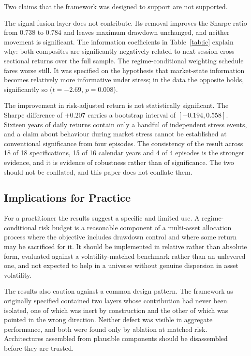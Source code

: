 Two claims that the framework was designed to support are not supported.

The signal fusion layer does not contribute. Its removal improves the Sharpe ratio from
0.738 to 0.784 and leaves maximum drawdown unchanged, and neither movement is
significant. The information coefficients in Table~\ref{tab:ic} explain why: both composites are
significantly negatively related to next-session cross-sectional returns over the full
sample. The regime-conditional weighting schedule fares worse still. It was specified on
the hypothesis that market-state information becomes relatively more informative under
stress; in the data the opposite holds, significantly so ($t = -2.69$, $p = 0.008$).

The improvement in risk-adjusted return is not statistically significant. The Sharpe
difference of $+0.207$ carries a bootstrap interval of $[-0.194, 0.558]$. Sixteen years
of daily returns contain only a handful of independent stress events, and a claim about
behaviour during market stress cannot be established at conventional significance from
four episodes. The consistency of the result across 18 of 18 specifications, 15 of 16
calendar years and 4 of 4 episodes is the stronger evidence, and it is evidence of
robustness rather than of significance. The two should not be conflated, and this paper
does not conflate them.

\subsection{Implications for Practice}

For a practitioner the results suggest a specific and limited use. A regime-conditional
risk budget is a reasonable component of a multi-asset allocation process where the
objective includes drawdown control and where some return may be sacrificed for it. It
should be implemented in relative rather than absolute form, evaluated against a
volatility-matched benchmark rather than an unlevered one, and not expected to help in
a universe without genuine dispersion in asset volatility.

The results also caution against a common design pattern. The framework as originally
specified contained two layers whose contribution had never been isolated, one of which
was inert by construction and the other of which was pointed in the wrong direction.
Neither defect was visible in aggregate performance, and both were found only by
ablation at matched risk. Architectures assembled from plausible components should be
disassembled before they are trusted.

